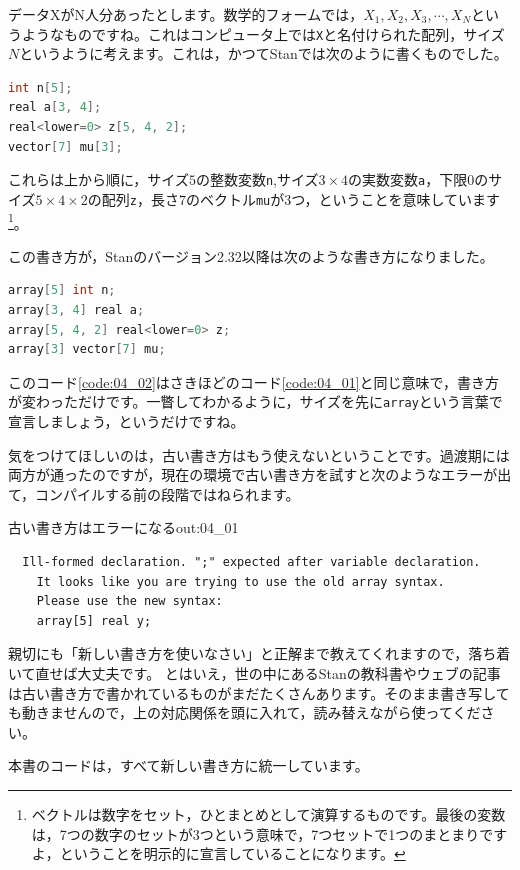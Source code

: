 \documentclass{ltjsbook}
\begin{document}
データXがN人分あったとします。数学的フォームでは，$X_1,X_2,X_3,\cdots, X_N$というようなものですね。これはコンピュータ上では\verb|X|と名付けられた配列，サイズ$N$というように考えます。これは，かつてStanでは次のように書くものでした。
\begin{lstlisting}[language=C++,label={code:04_01},caption={Stan2.32以前の書き方}]
int n[5];
real a[3, 4];
real<lower=0> z[5, 4, 2];
vector[7] mu[3];
\end{lstlisting}

これらは上から順に，サイズ$5$の整数変数\verb|n|,サイズ$3 \times 4$の実数変数\verb|a|，下限$0$のサイズ$5\times4\times2$の配列\verb|z|，長さ$7$のベクトル\verb|mu|が3つ，ということを意味しています\footnote{ベクトルは数字をセット，ひとまとめとして演算するものです。最後の変数は，7つの数字のセットが3つという意味で，7つセットで1つのまとまりですよ，ということを明示的に宣言していることになります。}。

この書き方が，Stanのバージョン2.32以降は次のような書き方になりました。
\begin{lstlisting}[language=C++,label={code:04_02},caption={Stan2.32以降の書き方}]
array[5] int n;
array[3, 4] real a;
array[5, 4, 2] real<lower=0> z;
array[3] vector[7] mu;
\end{lstlisting}
このコード\ref{code:04_02}はさきほどのコード\ref{code:04_01}と同じ意味で，書き方が変わっただけです。一瞥してわかるように，サイズを先に\verb|array|という言葉で宣言しましょう，というだけですね。

気をつけてほしいのは，古い書き方はもう使えないということです。過渡期には両方が通ったのですが，現在の環境で古い書き方を試すと次のようなエラーが出て，コンパイルする前の段階ではねられます。

\begin{Rscreen}{古い書き方はエラーになる}{out:04_01}
	\begin{verbatim}
  Ill-formed declaration. ";" expected after variable declaration.
    It looks like you are trying to use the old array syntax.
    Please use the new syntax:
    array[5] real y;
\end{verbatim}
\end{Rscreen}

親切にも「新しい書き方を使いなさい」と正解まで教えてくれますので，落ち着いて直せば大丈夫です。
とはいえ，世の中にあるStanの教科書やウェブの記事は古い書き方で書かれているものがまだたくさんあります。そのまま書き写しても動きませんので，上の対応関係を頭に入れて，読み替えながら使ってください。

本書のコードは，すべて新しい書き方に統一しています。
\end{document}
